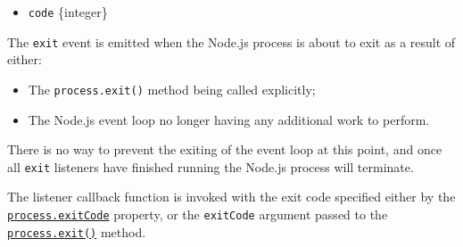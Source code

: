 \begin{itemize}
\tightlist
\item
  \texttt{code} \{integer\}
\end{itemize}

The \texttt{\textquotesingle{}exit\textquotesingle{}} event is emitted
when the Node.js process is about to exit as a result of either:

\begin{itemize}
\tightlist
\item
  The \texttt{process.exit()} method being called explicitly;
\item
  The Node.js event loop no longer having any additional work to
  perform.
\end{itemize}

There is no way to prevent the exiting of the event loop at this point,
and once all \texttt{\textquotesingle{}exit\textquotesingle{}} listeners
have finished running the Node.js process will terminate.

The listener callback function is invoked with the exit code specified
either by the \hyperref[processexitcode_1]{\texttt{process.exitCode}}
property, or the \texttt{exitCode} argument passed to the
\hyperref[processexitcode]{\texttt{process.exit()}} method.

\begin{Shaded}
\begin{Highlighting}[]
   \OperatorTok{;}

\NormalTok{(}\OperatorTok{,}\KeywordTok{=\textgreater{}}\NormalTok{ \{}
  \NormalTok{(}\SpecialCharTok{$\{}\SpecialCharTok{\}}\VerbatimStringTok{\textasciigrave{}}\NormalTok{)}\OperatorTok{;}
\NormalTok{\})}\OperatorTok{;}
\end{Highlighting}
\end{Shaded}

\begin{Shaded}
\begin{Highlighting}[]
  \OperatorTok{=} \NormalTok{(}\NormalTok{)}\OperatorTok{;}

\NormalTok{(}\OperatorTok{,}\KeywordTok{=\textgreater{}}\NormalTok{ \{}
  \NormalTok{(}\SpecialCharTok{$\{}\SpecialCharTok{\}}\VerbatimStringTok{\textasciigrave{}}\NormalTok{)}\OperatorTok{;}
\NormalTok{\})}\OperatorTok{;}
\end{Highlighting}
\end{Shaded}

